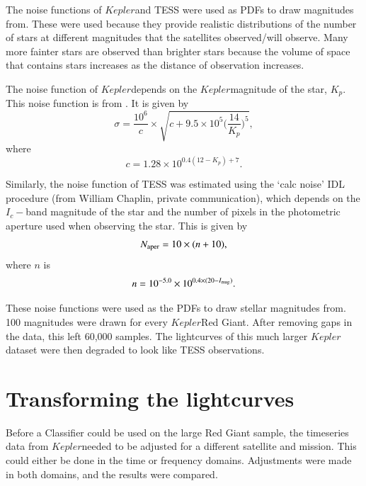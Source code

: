 \documentclass[a4paper,fleqn,usenatbib,useAMS]{mnras}
\newcommand{\kep}{\ensuremath{Kepler}\:}
\begin{document}
The noise functions of \kep and TESS were used as PDFs to draw magnitudes from. These were used because they provide realistic distributions of the number of stars at different magnitudes that the satellites observed/will observe. Many more fainter stars are observed than brighter stars because the volume of space that contains stars increases as the distance of observation increases.

The noise function of \kep depends on the \kep magnitude of the star, $K_{p}$. This noise function is from \citet{chaplin_predicting_2011}. It is given by
\begin{equation}
\sigma = \frac{10^{6}}{c} \times \sqrt{c+9.5 \times 10^{5}\Bigg(\frac{14}{K_{p}}\Bigg)^{5}} ,
\label{eq:kep noise}
\end{equation}
where
\begin{equation}
c = 1.28 \times 10^{0.4(12-K_{p})+7} .
\end{equation}

Similarly, the noise function of TESS was estimated using the `calc noise' IDL procedure (from William Chaplin, private communication), which depends on the $I_{c}-$band magnitude of the star and the number of pixels in the photometric aperture used when observing the star. This is given by
\begin{equation}
N_{\rm aper} = 10 \times (n+10) , 
\end{equation}
where $n$ is
\begin{equation}
\label{eq:tess noise}
n = 10^{-5.0} \times 10^{ 0.4 \times (20-I_{\rm mag})} .
\end{equation}

These noise functions were used as the PDFs to draw stellar magnitudes from. 100 magnitudes were drawn for every \kep Red Giant. After removing gaps in the data, this left 60,000 samples. The lightcurves of this much larger \kep dataset were then degraded to look like TESS observations.


\section{Transforming the lightcurves}
\label{sect: dataset}

Before a Classifier could be used on the large Red Giant sample, the timeseries data from \kep needed to be adjusted for a different satellite and mission. This could either be done in the time or frequency domains. Adjustments were made in both domains, and the results were compared. %
\end{document}
